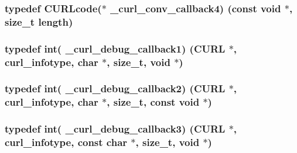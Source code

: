 \subsubsection[{\texorpdfstring{\+\_\+curl\+\_\+conv\+\_\+callback4}{_curl_conv_callback4}}]{\setlength{\rightskip}{0pt plus 5cm}typedef {\bf C\+U\+R\+Lcode}($\ast$ \+\_\+curl\+\_\+conv\+\_\+callback4) (const void $\ast$, size\+\_\+t {\bf length})}\hypertarget{typecheck-gcc_8h_ac3b116e3ba589ed78cc87e7c3112ea3a}{}\label{typecheck-gcc_8h_ac3b116e3ba589ed78cc87e7c3112ea3a}
\subsubsection[{\texorpdfstring{\+\_\+curl\+\_\+debug\+\_\+callback1}{_curl_debug_callback1}}]{\setlength{\rightskip}{0pt plus 5cm}typedef int( \+\_\+curl\+\_\+debug\+\_\+callback1) ({\bf C\+U\+RL} $\ast$, {\bf curl\+\_\+infotype}, char $\ast$, size\+\_\+t, void $\ast$)}\hypertarget{typecheck-gcc_8h_a7df204c26605e377eb51af8159aaa6aa}{}\label{typecheck-gcc_8h_a7df204c26605e377eb51af8159aaa6aa}
\subsubsection[{\texorpdfstring{\+\_\+curl\+\_\+debug\+\_\+callback2}{_curl_debug_callback2}}]{\setlength{\rightskip}{0pt plus 5cm}typedef int( \+\_\+curl\+\_\+debug\+\_\+callback2) ({\bf C\+U\+RL} $\ast$, {\bf curl\+\_\+infotype}, char $\ast$, size\+\_\+t, const void $\ast$)}\hypertarget{typecheck-gcc_8h_abff1bf0f556f56841d7ee494e28488a4}{}\label{typecheck-gcc_8h_abff1bf0f556f56841d7ee494e28488a4}
\subsubsection[{\texorpdfstring{\+\_\+curl\+\_\+debug\+\_\+callback3}{_curl_debug_callback3}}]{\setlength{\rightskip}{0pt plus 5cm}typedef int( \+\_\+curl\+\_\+debug\+\_\+callback3) ({\bf C\+U\+RL} $\ast$, {\bf curl\+\_\+infotype}, const char $\ast$, size\+\_\+t, void $\ast$)}\hypertarget{typecheck-gcc_8h_a6b69c0e254e465fbaf746b1ef7067914}{}\label{typecheck-gcc_8h_a6b69c0e254e465fbaf746b1ef7067914}

